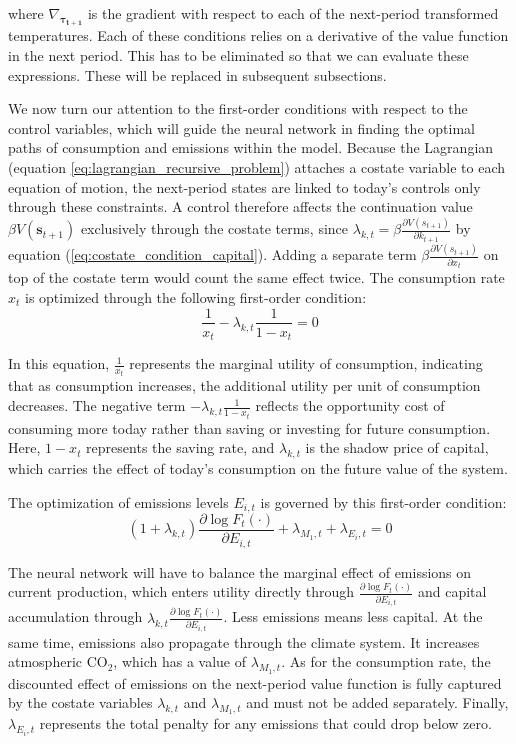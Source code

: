 where \(\nabla_{\bm{\tau_{t+1}}}\) is the gradient with respect to each of the next-period transformed temperatures. Each of these conditions relies on a derivative of the value function in the next period. This has to be eliminated so that we can evaluate these expressions. These will be replaced in subsequent subsections.

We now turn our attention to the first-order conditions with respect to the control variables, which will guide the neural network in finding the optimal paths of consumption and emissions within the model. Because the Lagrangian (equation \ref{eq:lagrangian_recursive_problem}) attaches a costate variable to each equation of motion, the next-period states are linked to today's controls only through these constraints. A control therefore affects the continuation value \(\beta V(\bm{s}_{t+1})\) exclusively through the costate terms, since \(\lambda_{k,t} = \beta \frac{\partial V(s_{t+1})}{\partial k_{t+1}}\) by equation (\ref{eq:costate_condition_capital}). Adding a separate term \(\beta \frac{\partial V(s_{t+1})}{\partial x_t}\) on top of the costate term would count the same effect twice. The consumption rate \(x_t\) is optimized through the following first-order condition:
\begin{equation}
    \frac{1}{x_t} 
        - \lambda_{k,t}\frac{1}{1-x_t} = 0
\label{eq:first_order_condition_consumption_rate}
\end{equation}

In this equation, \(\frac{1}{x_t}\) represents the marginal utility of consumption, indicating that as consumption increases, the additional utility per unit of consumption decreases. The negative term \(-\lambda_{k,t}\frac{1}{1-x_t}\) reflects the opportunity cost of consuming more today rather than saving or investing for future consumption. Here, \(1-x_t\) represents the saving rate, and \(\lambda_{k,t}\) is the shadow price of capital, which carries the effect of today's consumption on the future value of the system.

The optimization of emissions levels \(E_{i,t}\) is governed by this first-order condition:
\begin{equation}
    (1 + \lambda_{k,t}) \frac{\partial \log F_t(\cdot)}{\partial E_{i,t}}
        + \lambda_{M_1,t}
        + \lambda_{E_i,t}
        = 0
\label{eq:first_order_condition_emissions}
\end{equation}

The neural network will have to balance the marginal effect of emissions on current production, which enters utility directly through \(\frac{\partial \log F_t(\cdot)}{\partial E_{i,t}}\) and capital accumulation through \(\lambda_{k,t} \frac{\partial \log F_t(\cdot)}{\partial E_{i,t}}\). Less emissions means less capital. At the same time, emissions also propagate through the climate system. It increases atmospheric CO$_2$, which has a value of \(\lambda_{M_1,t}\). As for the consumption rate, the discounted effect of emissions on the next-period value function is fully captured by the costate variables \(\lambda_{k,t}\) and \(\lambda_{M_1,t}\) and must not be added separately. Finally, \(\lambda_{E_i,t}\) represents the total penalty for any emissions that could drop below zero.

